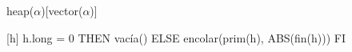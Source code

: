 \begin{Representacion}

  \begin{Estructura}{heap($\alpha$)}[vector($\alpha$)]
  \end{Estructura} 


  [h]{
    \IF h.long = 0 THEN vac\'{i}a() ELSE encolar(prim(h), ABS(fin(h))) FI
  }

\end{Representacion}


